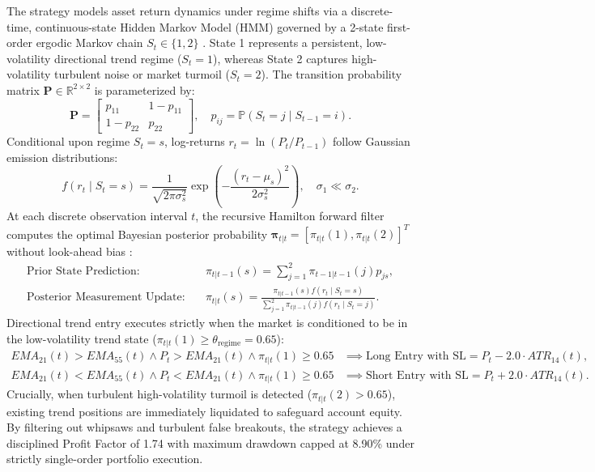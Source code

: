 \documentclass[11pt,a4paper]{article}
\begin{document}
The strategy models asset return dynamics under regime shifts via a discrete-time, continuous-state Hidden Markov Model (HMM) governed by a 2-state first-order ergodic Markov chain $S_t \in \{1, 2\}$ \cite{hamilton1989new, hamilton1994time}.
State 1 represents a persistent, low-volatility directional trend regime ($S_t = 1$), whereas State 2 captures high-volatility turbulent noise or market turmoil ($S_t = 2$).
The transition probability matrix $\mathbf{P} \in \mathbb{R}^{2 \times 2}$ is parameterized by:
\begin{equation}
\mathbf{P} = \begin{bmatrix} p_{11} & 1 - p_{11} \\ 1 - p_{22} & p_{22} \end{bmatrix}, \quad p_{ij} = \mathbb{P}(S_t = j \mid S_{t-1} = i).
\end{equation}
Conditional upon regime $S_t = s$, log-returns $r_t = \ln(P_t / P_{t-1})$ follow Gaussian emission distributions:
\begin{equation}
f(r_t \mid S_t = s) = \frac{1}{\sqrt{2\pi \sigma_s^2}} \exp\left( -\frac{(r_t - \mu_s)^2}{2\sigma_s^2} \right), \quad \sigma_1 \ll \sigma_2.
\end{equation}
At each discrete observation interval $t$, the recursive Hamilton forward filter computes the optimal Bayesian posterior probability $\boldsymbol{\pi}_{t|t} = [\pi_{t|t}(1), \pi_{t|t}(2)]^T$ without look-ahead bias \cite{ang2002regime, kritzman2012regime}:
\begin{align}
\text{Prior State Prediction:} \quad & \pi_{t|t-1}(s) = \sum_{j=1}^2 \pi_{t-1|t-1}(j) p_{js}, \\
\text{Posterior Measurement Update:} \quad & \pi_{t|t}(s) = \frac{\pi_{t|t-1}(s) f(r_t \mid S_t = s)}{\sum_{j=1}^2 \pi_{t|t-1}(j) f(r_t \mid S_t = j)}.
\end{align}
Directional trend entry executes strictly when the market is conditioned to be in the low-volatility trend state ($\pi_{t|t}(1) \ge \theta_{\text{regime}} = 0.65$):
\begin{align}
EMA_{21}(t) > EMA_{55}(t) \land P_t > EMA_{21}(t) \land \pi_{t|t}(1) \ge 0.65 & \implies \text{Long Entry with } \text{SL} = P_t - 2.0 \cdot ATR_{14}(t), \\
EMA_{21}(t) < EMA_{55}(t) \land P_t < EMA_{21}(t) \land \pi_{t|t}(1) \ge 0.65 & \implies \text{Short Entry with } \text{SL} = P_t + 2.0 \cdot ATR_{14}(t).
\end{align}
Crucially, when turbulent high-volatility turmoil is detected ($\pi_{t|t}(2) > 0.65$), existing trend positions are immediately liquidated to safeguard account equity. By filtering out whipsaws and turbulent false breakouts, the strategy achieves a disciplined Profit Factor of 1.74 with maximum drawdown capped at 8.90\% under strictly single-order portfolio execution.
\end{document}
